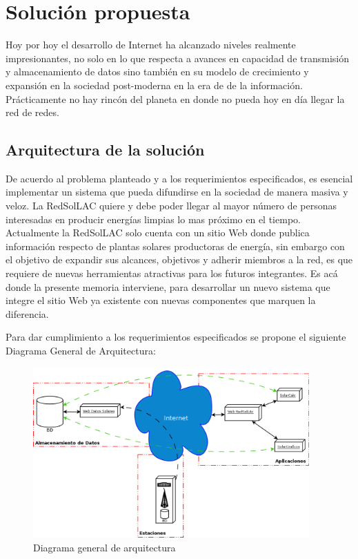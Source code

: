 \chapter{Solución propuesta}
\label{solucion}
Hoy por hoy el desarrollo de Internet ha alcanzado niveles realmente impresionantes, no solo en lo que respecta a avances en capacidad de transmisión y almacenamiento de datos sino también en su modelo de crecimiento y expansión en la sociedad post-moderna en la era de de la información. Prácticamente no hay rincón del planeta en donde no pueda hoy en día llegar la red de redes.\\

\section{Arquitectura de la solución}
\label{arquitectura}
De acuerdo al problema planteado y a los requerimientos especificados, es esencial implementar un sistema que pueda difundirse en la sociedad de manera masiva y veloz. La RedSolLAC quiere y debe poder llegar al mayor número de personas interesadas en producir energías limpias lo mas próximo en el tiempo.\\

Actualmente la RedSolLAC solo cuenta con un sitio Web donde publica información respecto de plantas solares productoras de energía, sin embargo con el objetivo de expandir sus alcances, objetivos y adherir miembros a la red, es que requiere de nuevas herramientas atractivas para los futuros integrantes. Es acá donde la presente memoria interviene, para desarrollar un nuevo sistema que integre el sitio Web ya existente con nuevas componentes que marquen la diferencia.

Para dar cumplimiento a los requerimientos especificados se propone el siguiente Diagrama General de Arquitectura:

\begin{figure}[h!]
        \centering
        \includegraphics[width=300pt]{images/diagramaArquitectura}
        \caption{Diagrama general de arquitectura}
	\label{da}
\end{figure}

